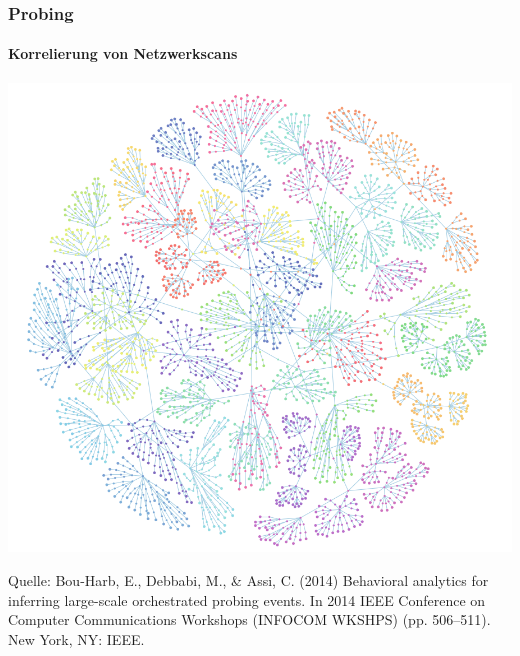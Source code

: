 \begin{frame}
\frametitle{Probing}
\framesubtitle{Korrelierung von Netzwerkscans}

\begin{center}
\includegraphics[scale=0.23]{img/statistical_network_analysis.png}
\end{center}



\vspace{0.5cm}

\footnoterule
\footnotesize{
    Quelle:
    Bou-Harb, E., Debbabi, M., \& Assi, C. (2014) Behavioral analytics for inferring
    large-scale orchestrated probing events. In 2014 IEEE Conference on Computer 
    Communications Workshops (INFOCOM WKSHPS) (pp. 506–511). New York, NY: IEEE.
}


\end{frame}


